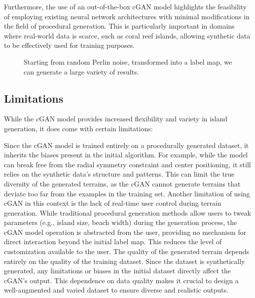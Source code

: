 Furthermore, the use of an out-of-the-box cGAN model highlights the feasibility of employing existing neural network architectures with minimal modifications in the field of procedural generation. This is particularly important in domains where real-world data is scarce, such as coral reef islands, allowing synthetic data to be effectively used for training purposes.

\begin{figure}
    \caption{Starting from random Perlin noise, transformed into a label map, we can generate a large variety of results. }
    \label{fig:coral-island-perlin-examples}
\end{figure}


\subsection{Limitations}
\label{sec:coral-island-limitations}

While the cGAN model provides increased flexibility and variety in island generation, it does come with certain limitations:

\begin{Itemize}
     Since the cGAN model is trained entirely on a procedurally generated dataset, it inherits the biases present in the initial algorithm. For example, while the model can break free from the radial symmetry constraint and center positioning, it still relies on the synthetic data's structure and patterns. This can limit the true diversity of the generated terrains, as the cGAN cannot generate terrains that deviate too far from the examples in the training set.
     Another limitation of using cGAN in this context is the lack of real-time user control during terrain generation. While traditional procedural generation methods allow users to tweak parameters (e.g., island size, beach width) during the generation process, the cGAN model operation is abstracted from the user, providing no mechanism for direct interaction beyond the initial label map. This reduces the level of customization available to the user. 
     The quality of the generated terrain depends entirely on the quality of the training dataset. Since the dataset is synthetically generated, any limitations or biases in the initial dataset directly affect the cGAN's output. This dependence on data quality makes it crucial to design a well-augmented and varied dataset to ensure diverse and realistic outputs.
\end{Itemize}

